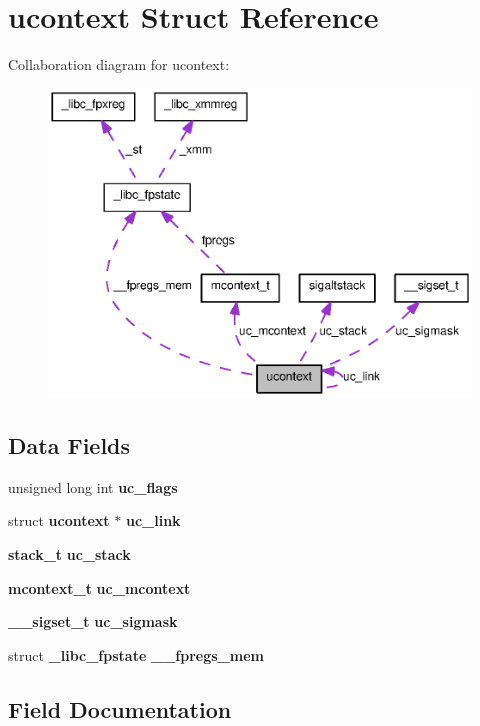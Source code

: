 \section{ucontext Struct Reference}
\label{structucontext}


Collaboration diagram for ucontext:
\nopagebreak
\begin{figure}[H]
\begin{center}
\leavevmode
\includegraphics[width=391pt]{structucontext__coll__graph}
\end{center}
\end{figure}
\subsection*{Data Fields}
\begin{DoxyCompactItemize}
\item 
unsigned long int {\bf uc\_\-flags}
\item 
struct {\bf ucontext} $\ast$ {\bf uc\_\-link}
\item 
{\bf stack\_\-t} {\bf uc\_\-stack}
\item 
{\bf mcontext\_\-t} {\bf uc\_\-mcontext}
\item 
{\bf \_\-\_\-sigset\_\-t} {\bf uc\_\-sigmask}
\item 
struct {\bf \_\-libc\_\-fpstate} {\bf \_\-\_\-fpregs\_\-mem}
\end{DoxyCompactItemize}


\subsection{Field Documentation}
